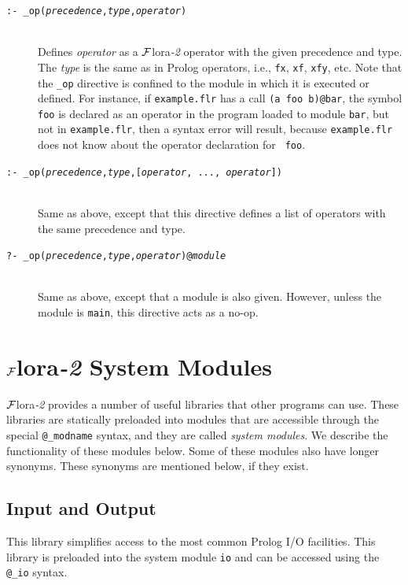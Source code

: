\documentclass[11pt]{article}
\newcommand{\FLORA}{{\mbox{\sc ${\cal F}${lora}\rm\emph{-2}}}\xspace}
\begin{document}
\begin{description}
\item[{\tt :-  \_op({\it precedence},{\it type},{\it operator})}]
 ~~~ \\
  Defines \emph{operator} as a \FLORA operator with the given precedence
  and type. The \emph{type} is the same as in Prolog operators, i.e.,
  {\tt fx}, {\tt xf}, {\tt xfy}, etc.
  Note that the {\tt \_op} directive is confined to
  the module in which it is executed or defined. For instance, if
  {\tt example.flr} has a call {\tt (a foo b)@bar}, the symbol {\tt foo} is
  declared as an operator in the program loaded to module {\tt bar}, but not in
  {\tt example.flr}, then a syntax error will result, because 
   {\tt example.flr} does not know about the operator declaration for {\tt
  foo}.
\item[{\tt :-  \_op({\it precedence},{\it type},[{\it operator}, ..., {\it operator}])}]
~~~  \\
  Same as above, except that this directive defines a list of operators
  with the same precedence and type.
\item[{\tt ?-  \_op({\it precedence},{\it type},{\it operator})@\emph{module}}]
 ~~~ \\
  Same as above, except that a module is also given. However, unless the
  module is {\tt main}, this directive acts as a no-op.
\end{description}


\section{\FLORA System Modules}\label{sec-service-libs}

\FLORA provides a number of useful libraries that other programs can use.
These libraries are statically preloaded into modules that are accessible
through the special {\tt @\_modname} syntax, and they are called
\emph{system modules}.  We describe the functionality of these modules
below. Some of these modules also have longer synonyms.
These synonyms are mentioned below, if they exist.

\subsection{Input and Output}

This library simplifies access to the most common Prolog I/O facilities.
This library is preloaded into the system module {\tt io} and
can be accessed using the {\tt @\_io} syntax.
\end{document}

